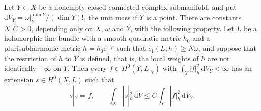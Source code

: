 \begin{theorem}\label{thm:compact-submanifold-extension}
Let $Y\subset X$ be a nonempty closed connected complex submanifold, and put $\mathrm dV_Y=\omega|_Y^{\dim Y}/(\dim Y)!$, the unit mass if $Y$ is a point. There are constants $N,C>0$, depending only on $X$, $\omega$ and $Y$, with the following property. Let $L$ be a holomorphic line bundle with a smooth quadratic metric $h_0$ and a plurisubharmonic metric $h=h_0\mathrm e^{-\varphi}$ such that $c_1(L,h)\geq N\omega$, and suppose that the restriction of $h$ to $Y$ is defined, that is, the local weights of $h$ are not identically $-\infty$ on $Y$. Then every $f\in H^0(Y,L|_Y)$ with $\int_Y|f|_h^2\,\mathrm dV_Y<\infty$ has an extension $s\in H^0(X,L)$ such that
\begin{equation}\label{eq:compact-submanifold-extension}
 s|_Y=f,\qquad
 \int_X|s|_h^2\,\mathrm dV\leq C\int_Y|f|_h^2\,\mathrm dV_Y.
\end{equation}
\end{theorem}
